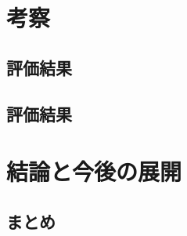 \documentclass{funthesis}
\begin{document}


\chapter{考察}

\section{評価結果}


\section{評価結果}



\chapter{結論と今後の展開}

\section{まとめ}


\end{document}
